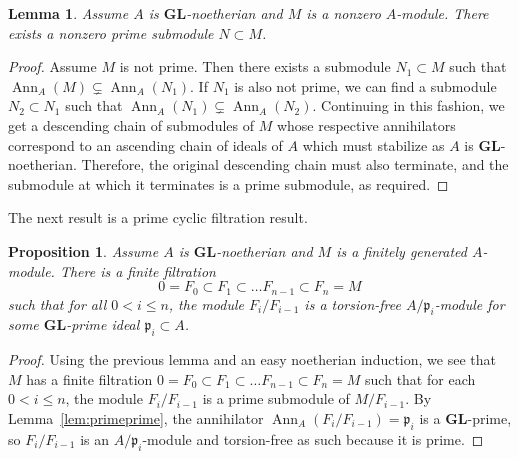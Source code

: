 \documentclass[12pt]{amsart}
\newcommand{\fp}{\mathfrak{p}}
\DeclareMathOperator{\Ann}{Ann}
\newcommand{\GL}{\mathbf{GL}}
\numberwithin{equation}{section}
\newtheorem{proposition}[equation]{Proposition}
\newtheorem{lemma}[equation]{Lemma}
\theoremstyle{definition}
\theoremstyle{plain}
\begin{document}
\begin{lemma}\label{lem:existenceass}
    Assume $A$ is $\GL$-noetherian and $M$ is a nonzero $A$-module. There exists a nonzero prime submodule $N \subset M$.
\end{lemma}
\begin{proof}
    Assume $M$ is not prime. Then there exists a submodule $N_1 \subset M$ such that $\Ann_A(M) \subsetneq \Ann_A(N_1)$. If $N_1$ is also not prime, we can find a submodule $N_2 \subset N_1$ such that $\Ann_A(N_1) \subsetneq \Ann_A(N_2)$. Continuing in this fashion, we get a descending chain of submodules of $M$ whose respective annihilators correspond to an ascending chain of ideals of $A$ which must stabilize as $A$ is $\GL$-noetherian. Therefore, the original descending chain must also terminate, and the submodule at which it terminates is a prime submodule, as required.
\end{proof}
The next result is a prime cyclic filtration result.
\begin{proposition}\label{prop:primecyclic}
   Assume $A$ is $\GL$-noetherian and $M$ is a finitely generated $A$-module. There is a finite filtration
   \[
   0 = F_0 \subset F_1 \subset \ldots F_{n-1} \subset F_n = M
   \]
   such that for all $0 < i \leq n$, the module $F_{i}/F_{i-1}$ is a torsion-free $A/\fp_i$-module for some $\GL$-prime ideal $\fp_i \subset A$.
\end{proposition}
\begin{proof}
Using the previous lemma and an easy noetherian induction, we see that $M$ has a finite filtration 
$0 = F_0 \subset F_1 \subset \ldots F_{n-1} \subset F_n = M$ such that for each $0 < i \leq n$, the module $F_i/F_{i-1}$ is a prime submodule of $M / F_{i-1}$. By Lemma~\ref{lem:primeprime}, the annihilator $\Ann_A(F_i/F_{i-1}) = \fp_i$ is a $\GL$-prime, so $F_i/F_{i-1}$ is an $A/\fp_i$-module and torsion-free as such because it is prime.
\end{proof}
\end{document}
